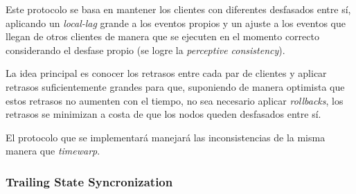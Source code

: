Este protocolo se basa en mantener los clientes con diferentes desfasados entre sí, aplicando un \emph{local-lag} grande a los eventos propios y un ajuste a los eventos que llegan de otros clientes de manera que se ejecuten en el momento correcto considerando el desfase propio (se logre la \emph{perceptive consistency}).

La idea principal es conocer los retrasos entre cada par de clientes y aplicar retrasos suficientemente grandes para que, suponiendo de manera optimista que estos retrasos no aumenten con el tiempo, no sea necesario aplicar \emph{rollbacks}, los retrasos se minimizan a costa de que los nodos queden desfasados entre sí.

El protocolo que se implementará manejará las inconsistencias de la misma manera que \emph{timewarp}.


\subsubsection{Trailing State Syncronization}





